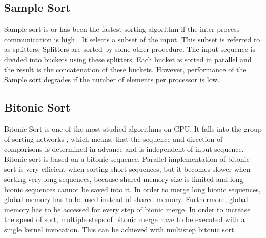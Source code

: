 \documentclass[conference]{IEEEtran}
\begin{document}
\subsection{Sample Sort}
Sample sort is or has been the fastest sorting algorithm if the inter-process communication is high . It selects a subset of the input. This subset is referred to as splitters. Splitters are sorted by some other procedure. The input sequence is divided into buckets using these splitters. Each bucket is sorted in parallel and the result is the concatenation of these buckets. However, performance of the Sample sort degrades if the number of elements per processor is low.

\subsection{Bitonic Sort}
Bitonic Sort is one of the most studied algorithms on GPU. It falls into the group of sorting networks , which means, that the sequence and direction of comparisons is determined in advance and is independent of input sequence. Bitonic sort is based on a bitonic sequence. Parallel implementation of bitonic sort is very efficient when sorting short sequences, but it becomes slower when sorting very long sequences, because shared memory size is limited and long bionic sequences cannot be saved into it. In order to merge long bionic sequences, global memory has to be used instead of shared memory. Furthermore, global memory has to be accessed for every step of bionic merge. In order to increase the speed of sort, multiple steps of bitonic merge have to be executed with a single kernel invocation. This can be achieved with multistep bitonic sort.\\

%
%
\end{document}
